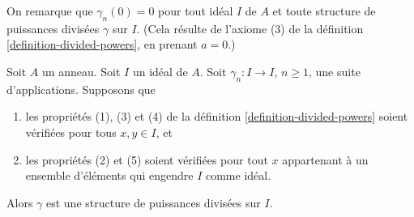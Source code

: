 \noindent
On remarque que $\gamma_n\left(0\right) = 0$ pour tout idéal $I$ de
$A$ et toute structure de puissances divisées $\gamma$ sur $I$. (Cela résulte
de l'axiome (3) de la définition \ref{definition-divided-powers},
en prenant $a=0$.)

\begin{lemma}
\label{lemma-check-on-generators}
Soit $A$ un anneau. Soit $I$ un idéal de $A$. Soit $\gamma_n : I \to I$,
$n \geq 1$, une suite d'applications. Supposons que
\begin{enumerate}
\item[(a)] les propriétés (1), (3) et (4) de la définition \ref{definition-divided-powers} soient
vérifiées pour tous $x, y \in I$, et
\item[(b)] les propriétés (2) et (5) soient vérifiées pour tout $x$ appartenant
à un ensemble d'éléments qui engendre $I$ comme idéal.
\end{enumerate}
Alors $\gamma$ est une structure de puissances divisées sur $I$.
\end{lemma}


